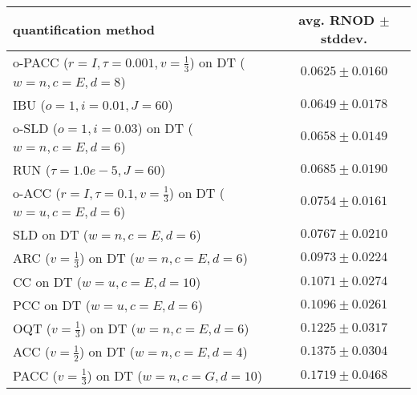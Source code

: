 \begin{tabular}{lc}
  \toprule
  quantification method & avg. RNOD $\pm$ stddev. \\
  \midrule
  o-PACC ($r=I, \tau=0.001, v=\frac{1}{3}$) on DT ($w=n, c=E, d=8$) & $\mathbf{0.0625 \pm 0.0160}$ \\
  IBU ($o=1, i=0.01, J=60$) & $0.0649 \pm 0.0178$ \\
  o-SLD ($o=1, i=0.03$) on DT ($w=n, c=E, d=6$) & $0.0658 \pm 0.0149$ \\
  RUN ($\tau=1.0e-5, J=60$) & $0.0685 \pm 0.0190$ \\
  o-ACC ($r=I, \tau=0.1, v=\frac{1}{3}$) on DT ($w=u, c=E, d=6$) & $0.0754 \pm 0.0161$ \\
  SLD on DT ($w=n, c=E, d=6$) & $0.0767 \pm 0.0210$ \\
  ARC ($v=\frac{1}{3}$) on DT ($w=n, c=E, d=6$) & $0.0973 \pm 0.0224$ \\
  CC on DT ($w=u, c=E, d=10$) & $0.1071 \pm 0.0274$ \\
  PCC on DT ($w=u, c=E, d=6$) & $0.1096 \pm 0.0261$ \\
  OQT ($v=\frac{1}{3}$) on DT ($w=n, c=E, d=6$) & $0.1225 \pm 0.0317$ \\
  ACC ($v=\frac{1}{2}$) on DT ($w=n, c=E, d=4$) & $0.1375 \pm 0.0304$ \\
  PACC ($v=\frac{1}{3}$) on DT ($w=n, c=G, d=10$) & $0.1719 \pm 0.0468$ \\
  \bottomrule
\end{tabular}
